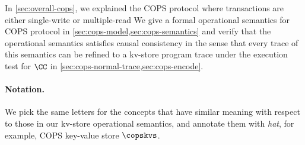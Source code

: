 In \cref{sec:overall-cops}, we explained the COPS protocol 
where transactions are either single-write or multiple-read
We give a formal operational semantics for COPS protocol in \cref{sec:cops-model,sec:cops-semantics}
and verify that the operational semantics satisfies causal consistency in the sense that
every trace of this semantics can be refined to a kv-store program trace under the execution test for \( \CC \) in \cref{sec:cops-normal-trace,sec:cops-encode}.

\paragraph{Notation.}
We pick the same letters for the concepts that have similar meaning with respect to those in our kv-store operational semantics,
and annotate them with \emph{hat}, for example, COPS key-value store \( \copskvs \).
